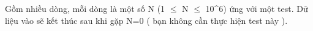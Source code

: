 Gồm nhiều dòng, mỗi dòng là một số N (1  $\le$  N  $\le$  10^6) ứng với một test. Dữ liệu vào sẽ kết thúc sau khi gặp N=0 ( bạn không cần thực hiện test này ).